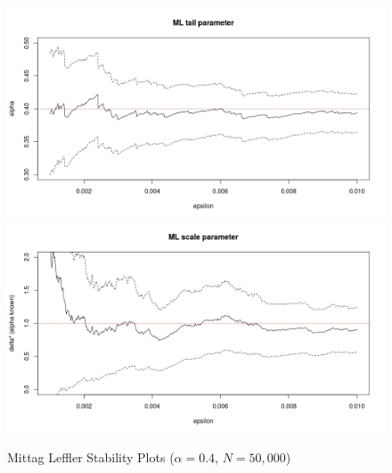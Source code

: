 \documentclass[honours,12pt]{unswthesis}
\newcommand{\1}{\mathbf 1}
\numberwithin{equation}{section}
\theoremstyle{definition}
\theoremstyle{remark}
\begin{document}


\begin{figure}[h]
    \centering
    \includegraphics[width=\textwidth]{Figures/MLtail01}
    \includegraphics[width=\textwidth]{Figures/MLscale01Fix}
    \caption{Mittag Leffler Stability Plots ($\alpha=0.4$, $N=50,000$)}\label{fig:MLstability}
\end{figure}
\end{document}
